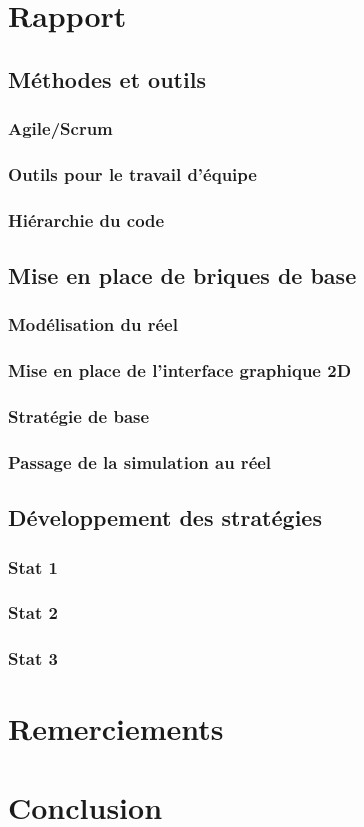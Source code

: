 \documentclass[12pt]{article}
\begin{document}
\newpage

\section{Rapport}
\subsection{Méthodes et outils}
\subsubsection{Agile/Scrum}
\subsubsection{Outils pour le travail d'équipe}
\subsubsection{Hiérarchie du code}
\subsection{Mise en place de briques de base}
\subsubsection{Modélisation du réel}
\subsubsection{Mise en place de l'interface graphique 2D}
\subsubsection{Stratégie de base}
\subsubsection{Passage de la simulation au réel}
\subsection{Développement des stratégies}
\subsubsection{Stat 1}
\subsubsection{Stat 2}
\subsubsection{Stat 3}

\newpage

\section{Remerciements}

\newpage

\section{Conclusion}
\end{document}
